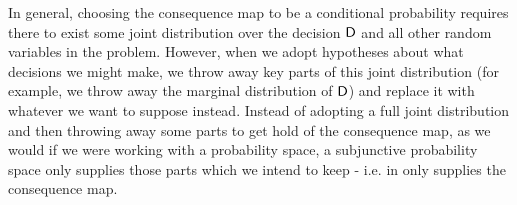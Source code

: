 In general, choosing the consequence map to be a conditional probability requires there to exist some joint distribution over the decision $\mathsf{D}$ and all other random variables in the problem. However, when we adopt hypotheses about what decisions we might make, we throw away key parts of this joint distribution (for example, we throw away the marginal distribution of $\mathsf{D}$) and replace it with whatever we want to suppose instead. Instead of adopting a full joint distribution and then throwing away some parts to get hold of the consequence map, as we would if we were working with a probability space, a subjunctive probability space only supplies those parts which we intend to keep - i.e. in only supplies the consequence map.
